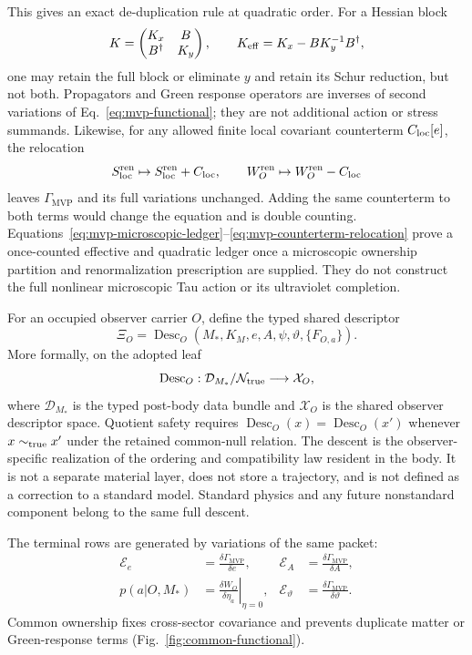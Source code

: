 \documentclass[11pt]{article}
\newcommand{\Desc}{\operatorname{Desc}}
\newcommand{\GMVP}{\Gamma_{\mathrm{MVP}}}
\begin{document}
This gives an exact de-duplication rule at quadratic order.  For a Hessian
block
\begin{equation}
 K=\begin{pmatrix}K_x&B\\B^\dagger&K_y\end{pmatrix},
 \qquad
 K_{\rm eff}=K_x-BK_y^{-1}B^\dagger,
 \label{eq:mvp-schur-ledger}
\end{equation}
one may retain the full block or eliminate \(y\) and retain its Schur
reduction, but not both.  Propagators and Green response operators are
inverses of second variations of Eq.~\eqref{eq:mvp-functional}; they are not
additional action or stress summands.  Likewise, for any allowed finite local
covariant counterterm \(C_{\rm loc}[e]\), the relocation
\begin{equation}
 S_{\rm loc}^{\rm ren}\mapsto S_{\rm loc}^{\rm ren}+C_{\rm loc},
 \qquad
 W_O^{\rm ren}\mapsto W_O^{\rm ren}-C_{\rm loc}
 \label{eq:mvp-counterterm-relocation}
\end{equation}
leaves \(\GMVP\) and its full variations unchanged.  Adding the same
counterterm to both terms would change the equation and is double counting.
Equations~\eqref{eq:mvp-microscopic-ledger}--\eqref{eq:mvp-counterterm-relocation}
prove a once-counted effective and quadratic ledger once a microscopic
ownership partition and renormalization prescription are supplied.  They do
not construct the full nonlinear microscopic Tau action or its ultraviolet
completion.

For an occupied observer carrier \(O\), define the typed shared descriptor
\begin{equation}
  \Xi_O=\Desc_O
  \left(M_*,K_M,e,A,\psi,\vartheta,\{F_{O,a}\}\right).
  \label{eq:shared-descriptor}
\end{equation}
More formally, on the adopted leaf
\[
  \Desc_O:\mathcal D_{M_*}/\mathcal N_{\rm true}\longrightarrow
  \mathcal X_O,
\]
where \(\mathcal D_{M_*}\) is the typed post-body data bundle and
\(\mathcal X_O\) is the shared observer descriptor space.  Quotient safety
requires \(\Desc_O(x)=\Desc_O(x')\) whenever \(x\sim_{\rm true}x'\) under the
retained common-null relation.
The descent is the observer-specific realization of the ordering and
compatibility law resident in the body.  It is not a separate material layer,
does not store a trajectory, and is not defined as a correction to a standard
model.  Standard physics and any future nonstandard component belong to the
same full descent.

The terminal rows are generated by variations of the same packet:
\begin{align}
  \mathcal E_e&=\frac{\delta\GMVP}{\delta e}, &
  \mathcal E_A&=\frac{\delta\GMVP}{\delta A},\label{eq:mvp-terminal-rows-a}\\
  p(a|O,M_*)&=\left.\frac{\delta W_O}{\delta\eta_a}\right|_{\eta=0}, &
  \mathcal E_{\vartheta}&=\frac{\delta\GMVP}{\delta\vartheta}.
  \label{eq:mvp-terminal-rows-b}
\end{align}
Common ownership fixes cross-sector covariance and prevents duplicate matter
or Green-response terms (Fig.~\ref{fig:common-functional}).
\end{document}
